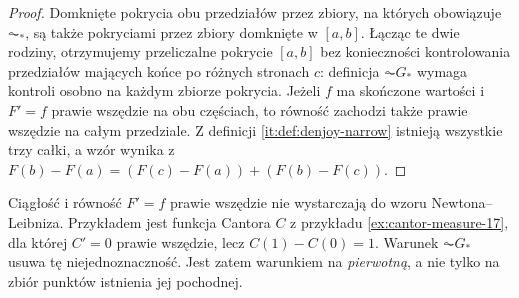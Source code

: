 \begin{proof}
Domknięte pokrycia obu przedziałów przez zbiory, na których obowiązuje $\AC_*$, są także pokryciami przez zbiory domknięte w $[a,b]$. Łącząc te dwie rodziny, otrzymujemy przeliczalne pokrycie $[a,b]$ bez konieczności kontrolowania przedziałów mających końce po różnych stronach $c$: definicja $\AC G_*$ wymaga kontroli osobno na każdym zbiorze pokrycia. Jeżeli $f$ ma skończone wartości i $F'=f$ prawie wszędzie na obu częściach, to równość zachodzi także prawie wszędzie na całym przedziale. Z definicji \ref{it:def:denjoy-narrow} istnieją wszystkie trzy całki, a wzór wynika z $F(b)-F(a)=(F(c)-F(a))+(F(b)-F(c))$.
\end{proof}
\begin{uwaga}
Ciągłość i równość $F'=f$ prawie wszędzie nie wystarczają do wzoru Newtona--Leibniza. Przykładem jest funkcja Cantora $C$ z przykładu \ref{ex:cantor-measure-17}, dla której $C'=0$ prawie wszędzie, lecz $C(1)-C(0)=1$. Warunek $\AC G_*$ usuwa tę niejednoznaczność. Jest zatem warunkiem na \emph{pierwotną}, a nie tylko na zbiór punktów istnienia jej pochodnej.
\end{uwaga}

